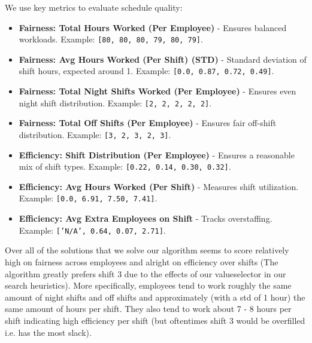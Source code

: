 \documentclass[11pt]{article}
\begin{document}
We use key metrics to evaluate schedule quality:
\begin{itemize}
    \item \textbf{Fairness: Total Hours Worked (Per Employee)} - Ensures balanced workloads. Example: \texttt{[80, 80, 80, 79, 80, 79]}.
    \item \textbf{Fairness: Avg Hours Worked (Per Shift) (STD)} - Standard deviation of shift hours, expected around 1. Example: \texttt{[0.0, 0.87, 0.72, 0.49]}.
    \item \textbf{Fairness: Total Night Shifts Worked (Per Employee)} - Ensures even night shift distribution. Example: \texttt{[2, 2, 2, 2, 2]}.
    \item \textbf{Fairness: Total Off Shifts (Per Employee)} - Ensures fair off-shift distribution. Example: \texttt{[3, 2, 3, 2, 3]}.
    \item \textbf{Efficiency: Shift Distribution (Per Employee)} - Ensures a reasonable mix of shift types. Example: \texttt{[0.22, 0.14, 0.30, 0.32]}.
    \item \textbf{Efficiency: Avg Hours Worked (Per Shift)} - Measures shift utilization. Example: \texttt{[0.0, 6.91, 7.50, 7.41]}.
    \item \textbf{Efficiency: Avg Extra Employees on Shift} - Tracks overstaffing. Example: \texttt{['N/A', 0.64, 0.07, 2.71]}.
\end{itemize}

Over all of the solutions that we solve our algorithm seems to score relatively high on fairness across employees
and alright on efficiency over shifts (The algorithm greatly prefers shift 3 due to the effects of our valueselector in our search heuristics). 
More specifically, employees tend to work roughly the same amount of night shifts and off shifts and approximately (with a std of 1 hour) the same amount of hours per shift. 
They also tend to work about 7 - 8 hours per shift indicating high efficiency per shift (but oftentimes shift 3 would be overfilled i.e. has the most slack). 
\end{document}
